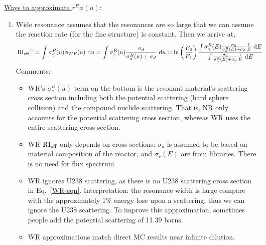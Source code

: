 \documentclass{school-22.211-notes}
\begin{document}
\uline{Ways to approximate $r^R \phi(u)$}: 
\begin{enumerate}
\item Wide resonance assumes that the resonances are so large that we can assume the reaction rate (for the fine structure) is constant. 
Then we arrive at, 
\begin{align}
\left. \mathrm{RI}_{\mathrm{eff}} \right.^{\gamma} &= \int \sigma_{\gamma}^R (u) \phi_{WR} (u) \mbox{ }\mathrm{d} u = \int \sigma_{\gamma}^R (u) \frac{\sigma_d}{\sigma_a^R(u) + \sigma_d} \mbox{ }\mathrm{d} u 
= \ln\left( \frac{E_2}{E_1} \right) \frac{ \int \sigma_{\gamma}^R (E) \frac{\sigma_d}{\sigma_{a}^R(E) + \sigma_d} \frac{1}{E} \mbox{ }\mathrm{d} E}{ \int \frac{\sigma_d}{\sigma_{a}^R(E) + \sigma_d} \frac{1}{E} \mbox{ }\mathrm{d} E}
\end{align}
Comments:
\begin{itemize}
\item WR's $\sigma_s^R (u)$ term on the bottom is the resonant material's scattering cross section including both the potential scattering (hard sphere collision) and the compound nuclide scattering. That is, NR only accounts for the potential scattering cross section, whereas WR uses the entire scattering cross section. 

\item WR $\mathrm{RI}_{\mathrm{eff}}$ only depends on cross sections: $\sigma_d$ is assumed to be based on material composition of the reactor, and $\sigma_r(E)$ are from libraries. There is no need for flux spectrum. 

\item WR ignores U238 scattering, as there is no U238 scattering cross section in Eq.~\ref{WR-eqn}. Interpretation: the resonance width is large compare with the approximately 1\% energy lose upon a scattering, thus we can ignore the U238 scattering. To improve this approximation, sometimes people add the potential scattering of 11.39 barns. 

\item WR approximations match direct MC results near infinite dilution. 
\end{itemize}


\end{enumerate}
\end{document}
